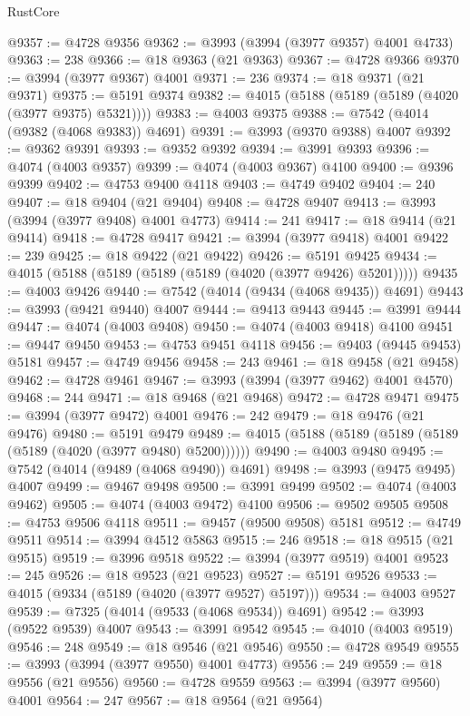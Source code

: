 \begin{lexlean}{RustCore}
\begin{coremodule}
@9357 := @4728 @9356
@9362 := @3993 (@3994 (@3977 @9357) @4001 @4733)
@9363 := 238
@9366 := @18 @9363 (@21 @9363)
@9367 := @4728 @9366
@9370 := @3994 (@3977 @9367) @4001
@9371 := 236
@9374 := @18 @9371 (@21 @9371)
@9375 := @5191 @9374
@9382 := @4015 (@5188 (@5189 (@5189 (@4020 (@3977 @9375) @5321))))
@9383 := @4003 @9375
@9388 := @7542 (@4014 (@9382 (@4068 @9383)) @4691)
@9391 := @3993 (@9370 @9388) @4007
@9392 := @9362 @9391
@9393 := @9352 @9392
@9394 := @3991 @9393
@9396 := @4074 (@4003 @9357)
@9399 := @4074 (@4003 @9367) @4100
@9400 := @9396 @9399
@9402 := @4753 @9400 @4118
@9403 := @4749 @9402
@9404 := 240
@9407 := @18 @9404 (@21 @9404)
@9408 := @4728 @9407
@9413 := @3993 (@3994 (@3977 @9408) @4001 @4773)
@9414 := 241
@9417 := @18 @9414 (@21 @9414)
@9418 := @4728 @9417
@9421 := @3994 (@3977 @9418) @4001
@9422 := 239
@9425 := @18 @9422 (@21 @9422)
@9426 := @5191 @9425
@9434 := @4015 (@5188 (@5189 (@5189 (@5189 (@4020 (@3977 @9426) @5201)))))
@9435 := @4003 @9426
@9440 := @7542 (@4014 (@9434 (@4068 @9435)) @4691)
@9443 := @3993 (@9421 @9440) @4007
@9444 := @9413 @9443
@9445 := @3991 @9444
@9447 := @4074 (@4003 @9408)
@9450 := @4074 (@4003 @9418) @4100
@9451 := @9447 @9450
@9453 := @4753 @9451 @4118
@9456 := @9403 (@9445 @9453) @5181
@9457 := @4749 @9456
@9458 := 243
@9461 := @18 @9458 (@21 @9458)
@9462 := @4728 @9461
@9467 := @3993 (@3994 (@3977 @9462) @4001 @4570)
@9468 := 244
@9471 := @18 @9468 (@21 @9468)
@9472 := @4728 @9471
@9475 := @3994 (@3977 @9472) @4001
@9476 := 242
@9479 := @18 @9476 (@21 @9476)
@9480 := @5191 @9479
@9489 := @4015 (@5188 (@5189 (@5189 (@5189 (@5189 (@4020 (@3977 @9480) @5200))))))
@9490 := @4003 @9480
@9495 := @7542 (@4014 (@9489 (@4068 @9490)) @4691)
@9498 := @3993 (@9475 @9495) @4007
@9499 := @9467 @9498
@9500 := @3991 @9499
@9502 := @4074 (@4003 @9462)
@9505 := @4074 (@4003 @9472) @4100
@9506 := @9502 @9505
@9508 := @4753 @9506 @4118
@9511 := @9457 (@9500 @9508) @5181
@9512 := @4749 @9511
@9514 := @3994 @4512 @5863
@9515 := 246
@9518 := @18 @9515 (@21 @9515)
@9519 := @3996 @9518
@9522 := @3994 (@3977 @9519) @4001
@9523 := 245
@9526 := @18 @9523 (@21 @9523)
@9527 := @5191 @9526
@9533 := @4015 (@9334 (@5189 (@4020 (@3977 @9527) @5197)))
@9534 := @4003 @9527
@9539 := @7325 (@4014 (@9533 (@4068 @9534)) @4691)
@9542 := @3993 (@9522 @9539) @4007
@9543 := @3991 @9542
@9545 := @4010 (@4003 @9519)
@9546 := 248
@9549 := @18 @9546 (@21 @9546)
@9550 := @4728 @9549
@9555 := @3993 (@3994 (@3977 @9550) @4001 @4773)
@9556 := 249
@9559 := @18 @9556 (@21 @9556)
@9560 := @4728 @9559
@9563 := @3994 (@3977 @9560) @4001
@9564 := 247
@9567 := @18 @9564 (@21 @9564)

\end{coremodule}
\end{lexlean}
